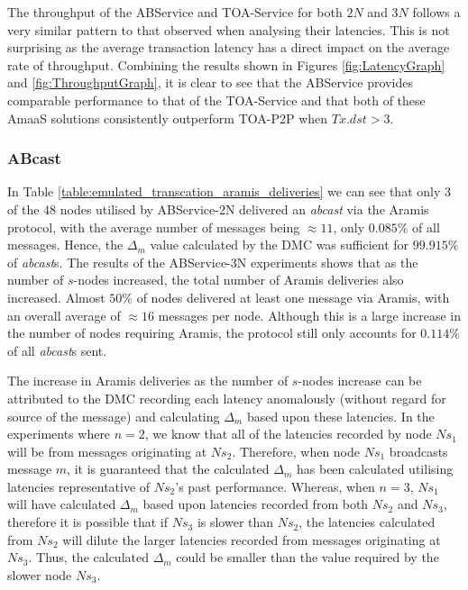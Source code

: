 	The throughput of the ABService and TOA-Service for both $2N$ and $3N$ follows a very similar pattern to that observed when analysing their latencies.  This is not surprising as the average transaction latency has a direct impact on the average rate of throughput.  Combining the results shown in Figures \ref{fig:LatencyGraph} and \ref{fig:ThroughputGraph}, it is clear to see that the ABService provides comparable performance to that of the TOA-Service and that both of these \textsf{AmaaS} solutions consistently outperform TOA-P2P when $Tx.dst > 3$.  
	
	\subsubsection*{ABcast}
	In Table \ref{table:emulated_transcation_aramis_deliveries} we can see that only $3$ of the $48$ nodes utilised by ABService-2N delivered an \emph{abcast} via the \textsf{Aramis} protocol, with the average number of messages being $\approx 11$, only $0.085\%$ of all messages.  Hence, the $\Delta_m$ value calculated by the DMC was sufficient for  $99.915\%$ of \emph{abcast}s.  The results of the ABService-3N experiments shows that as the number of $s$-nodes increased,  the total number of \textsf{Aramis} deliveries also increased.  Almost $50\%$ of nodes delivered at least one message via \textsf{Aramis}, with an overall average of $\approx 16$ messages per node.  Although this is a large increase in the number of nodes requiring \textsf{Aramis}, the protocol still only accounts for $0.114\%$ of all \emph{abcast}s sent.  
	
	The increase in \textsf{Aramis} deliveries as the number of $s$-nodes increase can be attributed to the DMC recording each latency anomalously (without regard for source of the message) and calculating $\Delta_m$ based upon these latencies.  In the experiments where $n=2$, we know that all of the latencies recorded by node $Ns_1$ will be from messages originating at $Ns_2$.  Therefore, when node $Ns_1$ broadcasts message $m$, it is guaranteed that the calculated $\Delta_m$ has been calculated utilising latencies representative of $Ns_2$'s past performance.  Whereas, when $n=3$, $Ns_1$ will have calculated $\Delta_m$ based upon latencies recorded from both $Ns_2$ and $Ns_3$, therefore it is possible that if $Ns_3$ is slower than $Ns_2$, the latencies calculated from $Ns_2$ will dilute the larger latencies recorded from messages originating at $Ns_3$.  Thus, the calculated $\Delta_m$ could be smaller than the value required by the slower node $Ns_3$.  
	
